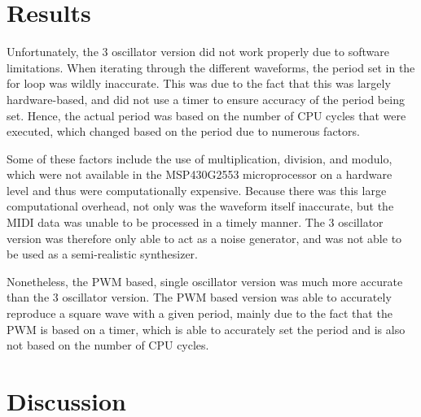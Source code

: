 \documentclass[10pt]{article}
\begin{document}
\section{Results}\label{sec:results}

Unfortunately, the 3 oscillator version did not work properly due to software limitations.
When iterating through the different waveforms, the period set in the for loop was wildly inaccurate.
This was due to the fact that this was largely hardware-based, and did not use a timer to ensure accuracy of the period being set.
Hence, the actual period was based on the number of CPU cycles that were executed, which changed based on the period due to numerous factors.

Some of these factors include the use of multiplication, division, and modulo, which were not available in the MSP430G2553 microprocessor on a hardware level and thus were computationally expensive.
Because there was this large computational overhead, not only was the waveform itself inaccurate, but the MIDI data was unable to be processed in a timely manner.
The 3 oscillator version was therefore only able to act as a noise generator, and was not able to be used as a semi-realistic synthesizer.

Nonetheless, the PWM based, single oscillator version was much more accurate than the 3 oscillator version.
The PWM based version was able to accurately reproduce a square wave with a given period, mainly due to the fact that the PWM is based on a timer, which is able to accurately set the period and is also not based on the number of CPU cycles.





\section{Discussion}\label{sec:discussion}

\end{document}
